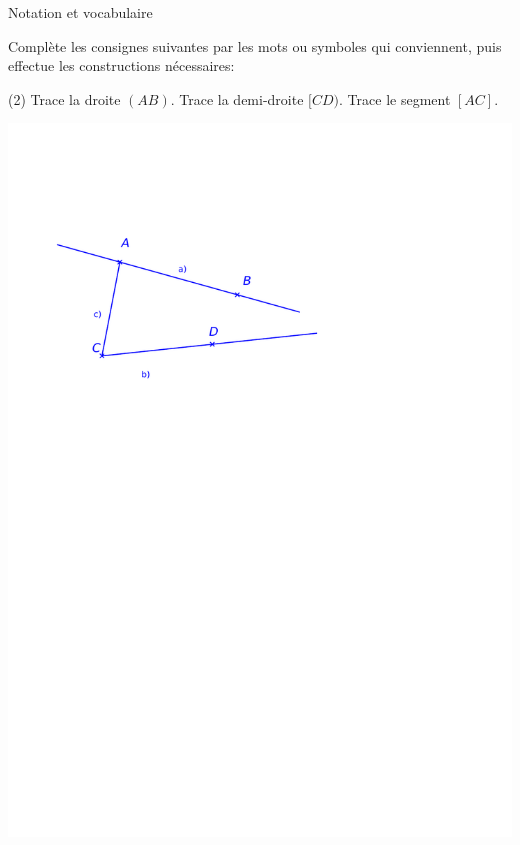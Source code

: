 \documentclass[a4paper,11pt]{report}
\begin{document}
\begin{resolu}{Notation et vocabulaire} {Complète les consignes suivantes par les mots ou symboles qui conviennent, puis effectue les constructions nécessaires: 
\begin{tasks}(2)
\task Trace la droite $(AB)$.
\task Trace la demi-droite $[CD)$.
\task Trace le segment $[AC]$.
\end{tasks}
\begin{center}
\includegraphics[scale=0.8]{media/es-11/13-r1}

\end{center}}
\end{resolu}
\end{document}
